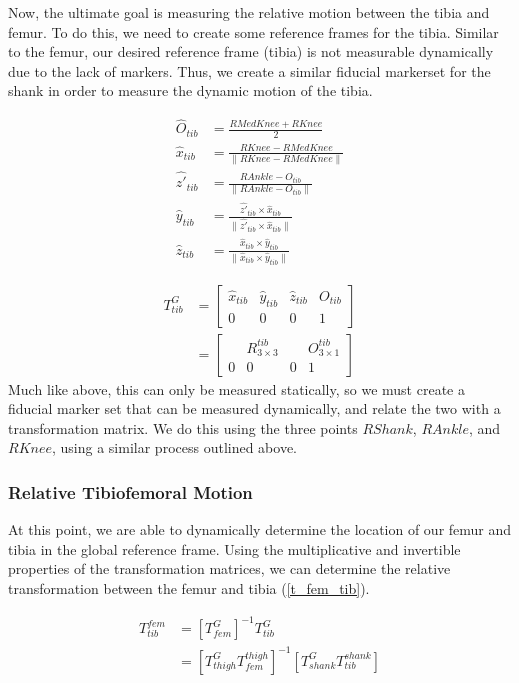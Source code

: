\documentclass{IEEEtran}
\begin{document}
    Now, the ultimate goal is measuring the relative motion between the tibia and femur. To do this, we need to create some reference frames for the tibia. Similar to the femur, our desired reference frame (tibia) is not measurable dynamically due to the lack of markers. Thus, we create a similar fiducial markerset for the shank in order to measure the dynamic motion of the tibia.

    \begin{equation}
        \begin{aligned}
            \hat{O}_{tib} &= \frac{RMedKnee + RKnee}{2}\\
            \hat{x}_{tib} & = \frac{RKnee - RMedKnee}{\|RKnee - RMedKnee\|} \\
            \hat{z'}_{tib} &= \frac{RAnkle - O_{tib}}{\|RAnkle - O_{tib}\|} \\
            \hat{y}_{tib} &= \frac{\hat{z'}_{tib} \times \hat{x}_{tib}}{\|\hat{z'}_{tib} \times \hat{x}_{tib}\|} \\
            \hat{z}_{tib} & = \frac{\hat{x}_{tib} \times \hat{y}_{tib}}{\|\hat{x}_{tib} \times \hat{y}_{tib}\|}
        \end{aligned}
        \label{tib_rf}
    \end{equation}

    \begin{equation}
        \begin{aligned}
            T^{G}_{tib} &= \begin{bmatrix}
                \hat{x}_{tib} &\hat{y}_{tib} &\hat{z}_{tib} & O_{tib} \\
                0 & 0 & 0 & 1
            \end{bmatrix} \\
            &= \begin{bmatrix}
                & R^{tib}_{3 \times 3} & & O^{tib}_{3 \times 1} \\
                0 & 0 & 0 & 1
            \end{bmatrix}
        \end{aligned}
        \label{t_gt}
    \end{equation}
    Much like above, this can only be measured statically, so we must create a fiducial marker set that can be measured dynamically, and relate the two with a transformation matrix. We do this using the three points $RShank$, $RAnkle$, and $RKnee$, using a similar process outlined above.

    \subsubsection{Relative Tibiofemoral Motion}
    At this point, we are able to dynamically determine the location of our femur and tibia in the global reference frame. Using the multiplicative and invertible properties of the transformation matrices, we can determine the relative transformation between the femur and tibia (\ref{t_fem_tib}).

    \begin{equation}
        \begin{aligned}
            T^{fem}_{tib} &= [T^{G}_{fem}]^{-1}T^{G}_{tib} \\
            &= [T^{G}_{thigh}T^{thigh}_{fem}]^{-1}[T^{G}_{shank}T^{shank}_{tib}]
        \end{aligned}
        \label{t_fem_tib}
    \end{equation}
\end{document}
